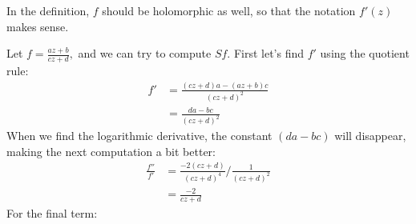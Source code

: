 \documentclass{homework}
\begin{document}
                                                                                                                                   \begin{solution}
                                                                                                                                   In the definition, $f$ should be holomorphic as well, so that the notation $f'(z)$ makes sense.

                                                                                                                                   Let $f=\frac{az + b}{cz + d},$ and we can try to compute $Sf$. First let's find $f'$ using the quotient rule:
                                                                                                                                   \begin{align*}
                                                                                                                                   f' &= \frac{(cz + d)a - (az + b)c}{(cz + d)^2}\\
                                                                                                                                   &= \frac{da - bc}{(cz + d)^2}
                                                                                                                                   \end{align*}
                                                                                                                                   When we find the logarithmic derivative, the constant $(da - bc)$ will disappear, making the next computation a bit better:
                                                                                                                                   \begin{align*}
                                                                                                                                   \frac{f''}{f'} &= \frac{-2(cz + d)}{(cz+d)^4} / \frac{1}{(cz+d)^2}\\
                                                                                                                                   &= \frac{-2}{cz + d}
                                                                                                                                   \end{align*}
                                                                                                                                   For the final term:

\end{solution}
\end{document}
